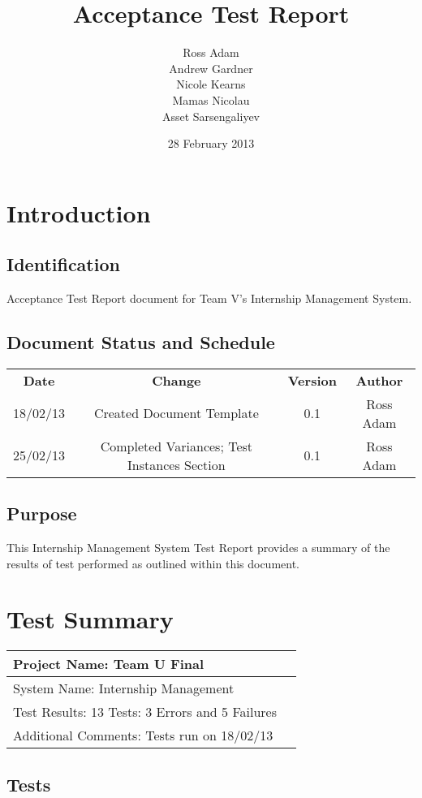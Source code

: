 \documentclass{l3deliverable}
\title{Acceptance Test Report}
\author{
  Ross Adam \\
  Andrew Gardner \\
  Nicole Kearns \\
  Mamas Nicolau \\
  Asset Sarsengaliyev \\
  }
\date{28 February 2013}
\begin{document}
\maketitle
\tableofcontents
\newpage
\section{Introduction}
\subsection{Identification}
Acceptance Test Report document for Team V's Internship Management System.
\subsection{Document Status and Schedule}
\begin{center}{
\begin{tabular}{|c|c|c|c|}
\hline \textbf{Date} &\textbf{Change} & \textbf{Version} & \textbf{Author}\\ 
18/02/13 & Created Document Template & 0.1 & Ross Adam\\
25/02/13 & Completed Variances; Test Instances Section & 0.1 & Ross Adam\\
\hline 
\end{tabular} }
\end{center}

\subsection{Purpose}
This Internship Management System Test Report provides a summary of the results of test performed as outlined within this document.

\section{Test Summary}

\begin{tabular}{|l|l|}
\hline
Project Name: Team U Final & \\
\hline
System Name: Internship Management &\\
\hline
Test Results: 13 Tests: 3 Errors and 5 Failures &\\
\hline
Additional Comments: Tests run on 18/02/13 &\\
\hline
\end{tabular}

\subsection{Tests}
\end{document}
